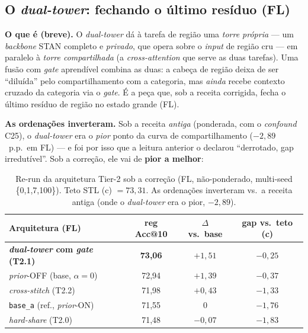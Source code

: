 \documentclass[11pt,a4paper]{article}
\newcommand{\good}[1]{\textcolor{green!45!black}{\textbf{#1}}}
\begin{document}
\subsection{O \textit{dual-tower}: fechando o último resíduo (FL)}\label{sec:dualtower}

\noindent\textbf{O que é (breve).} O \textit{dual-tower} dá à tarefa de região uma \emph{torre própria}
--- um \textit{backbone} STAN completo e \emph{privado}, que opera sobre o \textit{input} de região
cru --- em paralelo à \emph{torre compartilhada} (a \textit{cross-attention} que serve as duas
tarefas). Uma fusão com \textit{gate} aprendível combina as duas: a cabeça de região deixa de ser
``diluída'' pelo compartilhamento com a categoria, mas \emph{ainda} recebe contexto cruzado da
categoria via o \textit{gate}. É a peça que, sob a receita corrigida, fecha o último resíduo de região
no estado grande (FL).

\noindent\textbf{As ordenações inverteram.} Sob a receita \emph{antiga} (ponderada, com o
\textit{confound} C25), o \textit{dual-tower} era o \emph{pior} ponto da curva de compartilhamento
($-2{,}89$~p.p.\ em FL) --- e foi por isso que a leitura anterior o declarou ``derrotado, gap
irredutível''. Sob a correção, ele vai de \textbf{pior a melhor}:

\begin{table}[H]
\centering
\footnotesize
\caption{Re-run da arquitetura Tier-2 sob a correção (FL, não-ponderado, multi-seed \{0,1,7,100\}).
Teto STL (c) $=73{,}31$. As ordenações inverteram vs.\ a receita antiga (onde o \textit{dual-tower}
era o pior, $-2{,}89$).}
\renewcommand{\arraystretch}{1.15}
\begin{tabular}{lccc}
\toprule
\textbf{Arquitetura (FL)} & \textbf{reg Acc@10} & \textbf{$\Delta$ vs.\ base} & \textbf{gap vs.\ teto (c)} \\
\midrule
\textbf{\textit{dual-tower} com \textit{gate} (T2.1)} & \good{73,06} & \good{$+1,51$} & \good{$-0,25$} \\
\textit{prior}-OFF (base, $\alpha{=}0$) & 72,94 & $+1,39$ & $-0,37$ \\
\textit{cross-stitch} (T2.2) & 71,98 & $+0,43$ & $-1,33$ \\
\texttt{base\_a} (ref., \textit{prior}-ON) & 71,55 & $0$ & $-1,76$ \\
\textit{hard-share} (T2.0) & 71,48 & $-0,07$ & $-1,83$ \\
\bottomrule
\end{tabular}
\end{table}
\end{document}
